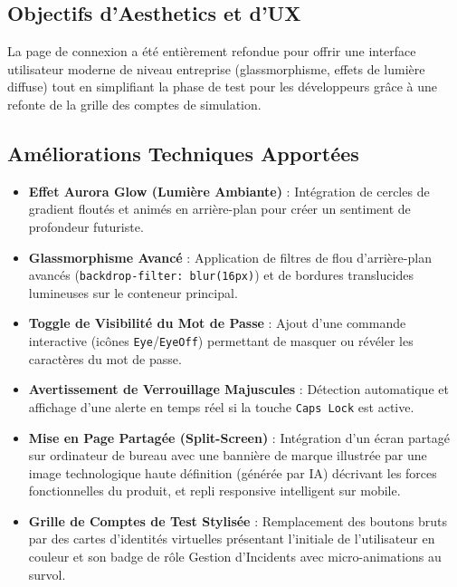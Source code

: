 \documentclass[12pt,a4paper]{article}
\begin{document}
\subsection{Objectifs d'Aesthetics et d'UX}
La page de connexion a été entièrement refondue pour offrir une interface utilisateur moderne de niveau entreprise (glassmorphisme, effets de lumière diffuse) tout en simplifiant la phase de test pour les développeurs grâce à une refonte de la grille des comptes de simulation.

\subsection{Améliorations Techniques Apportées}
\begin{itemize}
    \item \textbf{Effet Aurora Glow (Lumière Ambiante)} : Intégration de cercles de gradient floutés et animés en arrière-plan pour créer un sentiment de profondeur futuriste.
    \item \textbf{Glassmorphisme Avancé} : Application de filtres de flou d'arrière-plan avancés (\texttt{backdrop-filter: blur(16px)}) et de bordures translucides lumineuses sur le conteneur principal.
    \item \textbf{Toggle de Visibilité du Mot de Passe} : Ajout d'une commande interactive (icônes \texttt{Eye}/\texttt{EyeOff}) permettant de masquer ou révéler les caractères du mot de passe.
    \item \textbf{Avertissement de Verrouillage Majuscules} : Détection automatique et affichage d'une alerte en temps réel si la touche \texttt{Caps Lock} est active.
    \item \textbf{Mise en Page Partagée (Split-Screen)} : Intégration d'un écran partagé sur ordinateur de bureau avec une bannière de marque illustrée par une image technologique haute définition (générée par IA) décrivant les forces fonctionnelles du produit, et repli responsive intelligent sur mobile.
    \item \textbf{Grille de Comptes de Test Stylisée} : Remplacement des boutons bruts par des cartes d'identités virtuelles présentant l'initiale de l'utilisateur en couleur et son badge de rôle Gestion d'Incidents avec micro-animations au survol.
\end{itemize}
\end{document}

